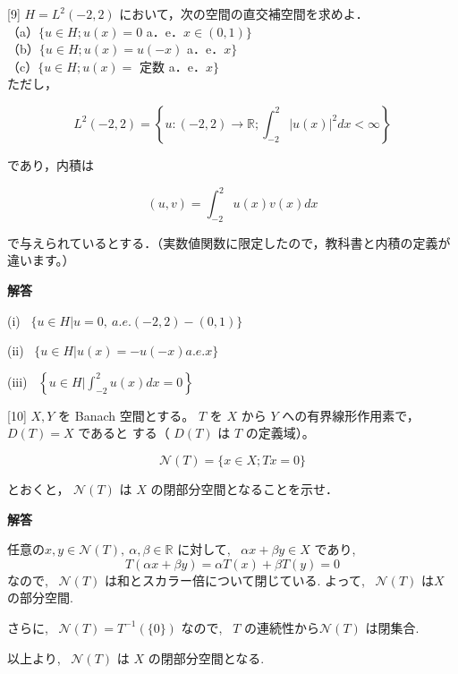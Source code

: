 \documentclass{jsarticle}
\begin{document}
\bigskip
\bigskip

\begin{itembox}[l]{[9]}
  $H=L^{2}(-2,2)$ において，次の空間の直交補空間を求めよ．\\
（a）$\{u \in H ; u(x)=0$ a．e．$x \in(0,1)\}$\\
（b）$\{u \in H ; u(x)=u(-x)$ a．e．$x\}$\\
（c）$\{u \in H ; u(x)=$ 定数 a．e．$x\}$\\
ただし，

$$
L^{2}(-2,2)=\left\{u:(-2,2) \rightarrow \mathbb{R} ; \int_{-2}^{2}|u(x)|^{2} d x<\infty\right\}
$$

であり，内積は

$$
(u, v)=\int_{-2}^{2} u(x) v(x) d x
$$

で与えられているとする．（実数値関数に限定したので，教科書と内積の定義が違います。）
\end{itembox}

\textbf{解答}

(i) \ $\{u \in H | u=0, \ a.e. (-2, 2) - (0, 1) \}$

(ii) \ $\{u \in H | u(x) = -u(-x) a.e. x \}$

(iii) \ $\left\{u \in H | \displaystyle \int_{-2}^2 u(x) dx = 0 \right\}$

\bigskip
\bigskip

\begin{itembox}[l]{[10]}
  $X, Y$ を Banach 空間とする。 $T$ を $X$ から $Y$ への有界線形作用素で，$D(T)=X$ であると する（ $D(T)$ は $T$ の定義域）。

$$
\mathcal{N}(T)=\{x \in X ; T x=0\}
$$

とおくと， $\mathcal{N}(T)$ は $X$ の閉部分空間となることを示せ．
\end{itembox}

\textbf{解答}

任意の$x, y \in \mathcal{N}(T), \ \alpha, \beta \in \mathbb{R}$ に対して, \ $\alpha x + \beta y \in X$ であり, \ 
$$
T(\alpha x + \beta y ) = \alpha T(x) + \beta T(y) = 0
$$
なので, \ $\mathcal{N}(T)$ は和とスカラー倍について閉じている. よって, \ $\mathcal{N}(T)$ は$X$ の部分空間.

さらに, \ $\mathcal{N}(T) = T^{-1}(\{0\})$ なので, \ $T$ の連続性から$\mathcal{N}(T)$ は閉集合.

以上より, \ $\mathcal{N}(T)$ は $X$ の閉部分空間となる.
\end{document}
